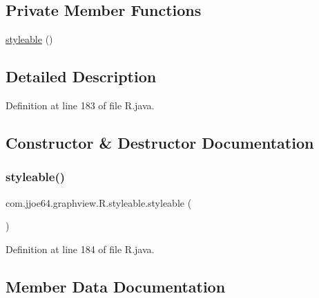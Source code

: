 \subsection*{Private Member Functions}
\begin{DoxyCompactItemize}
\item 
\mbox{\hyperlink{classcom_1_1jjoe64_1_1graphview_1_1_r_1_1styleable_ac0168245fef8b29793762da1d4e82f65}{styleable}} ()
\end{DoxyCompactItemize}


\subsection{Detailed Description}


Definition at line 183 of file R.\+java.



\subsection{Constructor \& Destructor Documentation}
\mbox{\label{classcom_1_1jjoe64_1_1graphview_1_1_r_1_1styleable_ac0168245fef8b29793762da1d4e82f65}} 
\subsubsection{\texorpdfstring{styleable()}{styleable()}}
{\footnotesize\ttfamily com.\+jjoe64.\+graphview.\+R.\+styleable.\+styleable (\begin{DoxyParamCaption}{ }\end{DoxyParamCaption})\hspace{0.3cm}{\ttfamily [private]}}



Definition at line 184 of file R.\+java.


\begin{DoxyCode}{0}

\end{DoxyCode}


\subsection{Member Data Documentation}
\mbox{\label{classcom_1_1jjoe64_1_1graphview_1_1_r_1_1styleable_af683975ef36a8c7a39aba1617a3dabfc}} 
